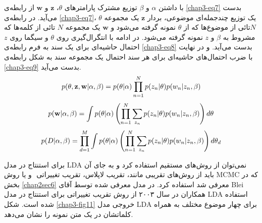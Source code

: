 با داشتن
$\alpha$
و
$\beta$
توزیع مشترک پارامترهای
$\theta$، $\textbf{z}$
و
$\textbf{w}$
از رابطه‌ی
\ref{chap3-eq7}
بدست می‌‌آید. در رابطه‌ی
\ref{chap3-eq7}، $\theta$
یک توزیع چندجمله‌ا‌ی موضوعی، بردار
$\textbf{z}$
یک مجموعه
$N$تائی‌
 از موضوع‌ها که از
$\theta$
نمونه گرفته می‌‌شود و
$\textbf{w}$
یک مجموعه
$N$
تائی‌ از کلمه‌ها که مشروط به
$\beta$
و
$z$
نمونه گرفته می‌‌شود. در ادامه با انتگرال‌گیری روی
$\theta$
و سیگما روی
$z$
 احتمال حاشیه‌ای برای یک سند به فرم رابطه‌ی
 \ref{chap3-eq8}
  بدست می‌‌آید. و در نهایت با ضرب احتمال‌های حاشیه‌ای برای هر سند احتمال یک مجموعه سند به شکل رابطه‌‌ی
 \ref{chap3-eq9}
  بدست می‌‌آید.
\begin{align}
\centering
\label{chap3-eq7}
	p(\theta,\textbf{z},\textbf{w}|\alpha,\beta) = p(\theta|\alpha)\prod_{n=1}^{N}p(z_n|\theta)p(w_n|z_n,\beta)
\end{align}
\begin{align}
\centering
\label{chap3-eq8}
p(\textbf{w}|\alpha,\beta) = \int p(\theta|\alpha) \left( \prod_{n=1}^{N} \sum_{z_n}p(z_n|\theta)p(w_n|z_n,\beta) \right)   d\theta
\end{align}
\begin{align}
\centering
\label{chap3-eq9}
p(D|\alpha,\beta) =\prod_{d=1}^{M} \int p(\theta|\alpha) \left( \prod_{n=1}^{N} \sum_{z_n}p(z_n|\theta)p(w_n|z_n,\beta) \right)d\theta_d
\end{align}

برای استنتاج در مدل
LDA
نمی‌توان از روش‌های مستقیم استفاده کرد و به جای آن باید از روش‌های تقریبی مانند، تقریب لاپلاس،
 تقریب تغییراتی
 ‌ و یا روش
MCMC
که در بخش
\ref{chap2sec6}
معرفی‌ شد استفاده کرد. در مدل معرفی‌ شده توسط آقای
Blei
همکاران 
\cite{blei2003latent}
در سال ۲۰۰۳ از روش تقریب تغییراتی‌ برای استنتاج در مدل
LDA
استفاده شده است. شکل
\ref{chap3-fig11}
خروجی مدل
LDA
برای چهار موضوع مختلف به همراه کلماتشان در یک متن نمونه را نشان می‌‌دهد.


